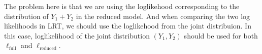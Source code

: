 \documentclass{article}
\begin{document}
	The problem here is that we are using the loglikehood corresponding to the distribution of $Y_1 + Y_2$ in the reduced model. And when comparing the two log likelihoods in LRT, we should use the loglikehood from the joint distribuion. In this case, loglikelihood of the joint distribution $(Y_1, Y_2)$ should be used for both $\ell_{\mathrm{full}}$ and $\ell_{\mathrm{reduced}}$.   









	
	
	
	
\end{document}
